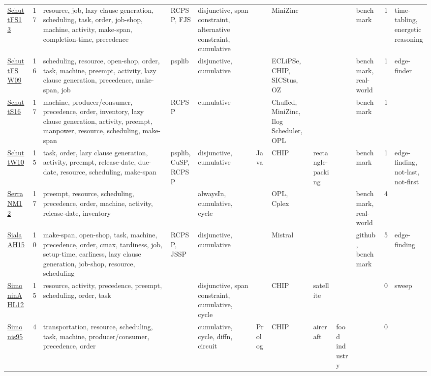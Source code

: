 {\begin{longtable}{p{3cm}rp{4cm}p{1.5cm}p{2cm}p{1.5cm}p{1.5cm}p{1.5cm}p{1.5cm}p{2cm}rp{1.5cm}}
\href{papers/SchuttFS13.pdf}{SchuttFS13}~\cite{SchuttFS13} & 17 & resource, job, lazy clause generation, scheduling, task, order, job-shop, machine, activity, make-span, completion-time, precedence & RCPSP, FJS & disjunctive, span constraint, alternative constraint, cumulative &  & MiniZinc &  &  & benchmark & 1 & time-tabling, energetic reasoning\\
\href{papers/SchuttFSW09.pdf}{SchuttFSW09}~\cite{SchuttFSW09} & 16 & scheduling, resource, open-shop, order, task, machine, preempt, activity, lazy clause generation, precedence, make-span, job & psplib & disjunctive, cumulative &  & ECLiPSe, CHIP, SICStus, OZ &  &  & benchmark, real-world & 1 & edge-finder\\
\href{papers/SchuttS16.pdf}{SchuttS16}~\cite{SchuttS16} & 17 & machine, producer/consumer, precedence, order, inventory, lazy clause generation, activity, preempt, manpower, resource, scheduling, make-span & RCPSP & cumulative &  & Chuffed, MiniZinc, Ilog Scheduler, OPL &  &  & benchmark & 1 & \\
\href{papers/SchuttW10.pdf}{SchuttW10}~\cite{SchuttW10} & 15 & task, order, lazy clause generation, activity, preempt, release-date, due-date, resource, scheduling, make-span & psplib, CuSP, RCPSP & disjunctive, cumulative & Java & CHIP & rectangle-packing &  & benchmark & 1 & edge-finding, not-last, not-first\\
\href{papers/SerraNM12.pdf}{SerraNM12}~\cite{SerraNM12} & 17 & preempt, resource, scheduling, precedence, order, machine, activity, release-date, inventory &  & alwaysIn, cumulative, cycle &  & OPL, Cplex &  &  & benchmark, real-world & 4 & \\
\href{papers/SialaAH15.pdf}{SialaAH15}~\cite{SialaAH15} & 10 & make-span, open-shop, task, machine, precedence, order, cmax, tardiness, job, setup-time, earliness, lazy clause generation, job-shop, resource, scheduling & RCPSP, JSSP & disjunctive, cumulative &  & Mistral &  &  & github, benchmark & 5 & edge-finding\\
\href{papers/SimoninAHL12.pdf}{SimoninAHL12}~\cite{SimoninAHL12} & 15 & resource, activity, precedence, preempt, scheduling, order, task &  & disjunctive, span constraint, cumulative, cycle &  & CHIP & satellite &  &  & 0 & sweep\\
\href{papers/Simonis95.pdf}{Simonis95}~\cite{Simonis95} & 4 & transportation, resource, scheduling, task, machine, producer/consumer, precedence, order &  & cumulative, cycle, diffn, circuit & Prolog & CHIP & aircraft & food industry &  & 0 & \\

\end{longtable}}
